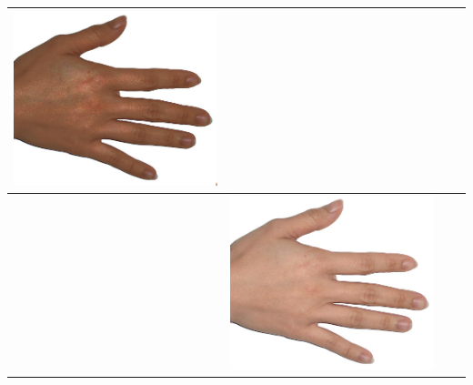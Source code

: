\begin{longtable}{|N||c|c|c|}
\begin{minipage}{.29\textwidth}
    \includegraphics[width=\textwidth,height=\textheight,keepaspectratio]{../rc_test/outputs/20170516_proportional_test/hand_light_to_hand_dark.jpg}
  \end{minipage} \\
\hline  \label{row:prop_test_hand_light_to_hand_brown} &
  \begin{minipage}{.29\textwidth}
    \includegraphics[width=\textwidth,height=\textheight,keepaspectratio]{../inputs/hand_light.jpg}
  \end{minipage} & 

\end{longtable}
